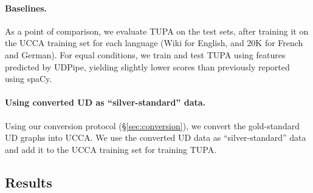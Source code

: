 \documentclass[11pt,a4paper]{article}
\begin{document}
\paragraph{Baselines.}

As a point of comparison, we evaluate TUPA \cite{hershcovich2017a} on the test sets,
after training it on the UCCA training set for each language (Wiki for English,
and 20K for French and German).
For equal conditions,
we train and test TUPA using features predicted by UDPipe,
yielding slightly lower scores than previously reported using spaCy.%

\paragraph{Using converted UD as ``silver-standard'' data.}

Using our conversion protocol (\S\ref{sec:conversion}),
we convert the gold-standard UD graphs into UCCA.
We use the converted UD data as ``silver-standard'' data \cite{W17-7306,N18-1104}
and add it to the UCCA training set for training TUPA.

\subsection{Results}\label{sec:results}
\end{document}
